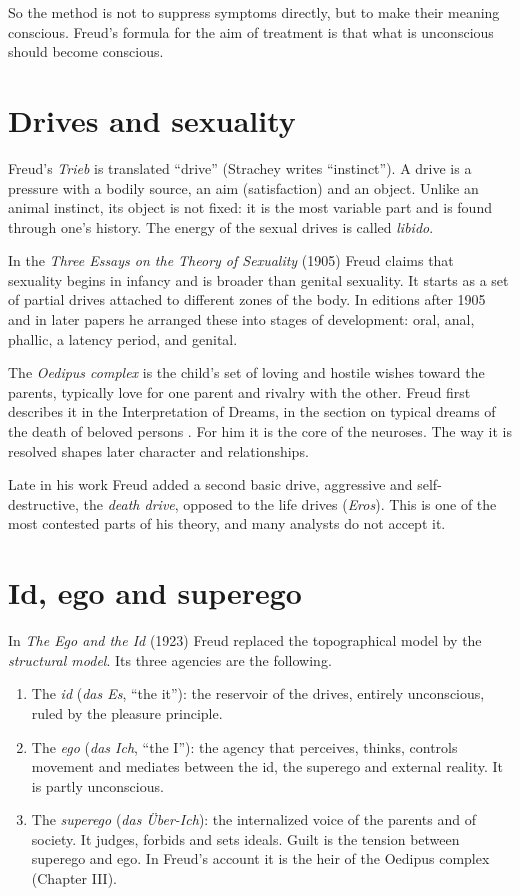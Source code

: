 So the method is not to suppress
symptoms directly, but to make their
meaning conscious. Freud's formula for
the aim of treatment is that what is
unconscious should become conscious.

\section{Drives and sexuality}
\label{section-drives}

Freud's \emph{Trieb} is translated
``drive'' (Strachey writes
``instinct''). A drive is a pressure
with a bodily source, an aim
(satisfaction) and an object. Unlike an
animal instinct, its object is not
fixed: it is the most variable part and
is found through one's history. The
energy of the sexual drives is called
\emph{libido}.

In the \emph{Three Essays on the Theory
of Sexuality} (1905)
\cite{freud-se-7-three-essays} Freud
claims that sexuality begins in infancy
and is broader than genital sexuality.
It starts as a set of partial drives
attached to different zones of the body.
In editions after 1905 and in later
papers he arranged these into stages of
development: oral, anal, phallic, a
latency period, and genital.

The \emph{Oedipus complex} is the
child's set of loving and hostile wishes
toward the parents, typically love for
one parent and rivalry with the other.
Freud first describes it in the
Interpretation of Dreams, in the section
on typical dreams of the death of
beloved persons
\cite{freud-se-4-5-dreams}. For him it is
the core of the neuroses. The way it is
resolved shapes later character and
relationships.

Late in his work Freud added a second
basic drive, aggressive and
self-destructive, the \emph{death
drive}, opposed to the life drives
(\emph{Eros}). This is one of the most
contested parts of his theory, and many
analysts do not accept it.

\section{Id, ego and superego}
\label{section-id-ego-superego}

In \emph{The Ego and the Id} (1923)
\cite{freud-se-19-ego-id} Freud replaced
the topographical model by the
\emph{structural model}. Its three
agencies are the following.

\begin{enumerate}
\item The \emph{id} (\emph{das Es},
``the it''): the reservoir of the
drives, entirely unconscious, ruled by
the pleasure principle.
\item The \emph{ego} (\emph{das Ich},
``the I''): the agency that perceives,
thinks, controls movement and mediates
between the id, the superego and
external reality. It is partly
unconscious.
\item The \emph{superego}
(\emph{das \"Uber-Ich}): the
internalized voice of the parents and
of society. It judges, forbids and sets
ideals. Guilt is the tension between
superego and ego. In Freud's account it
is the heir of the Oedipus complex
(Chapter III).
\end{enumerate}

